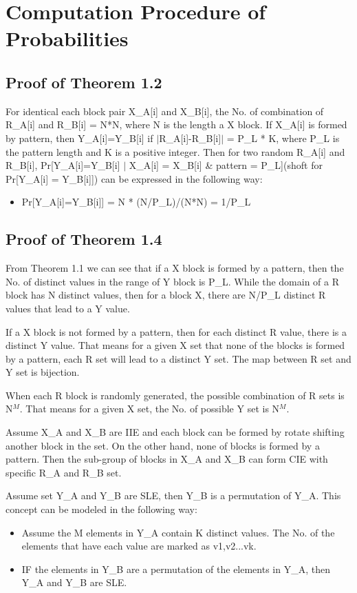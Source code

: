 \documentclass{article}
\begin{document}
\section{Computation Procedure of Probabilities}
\subsection{Proof of Theorem 1.2}
For identical each block pair X\_A[i] and X\_B[i], the No. of combination of R\_A[i] and R\_B[i] = N*N, where N is the length a X block. 
If X\_A[i] is formed by pattern, then Y\_A[i]=Y\_B[i] if $\mid$R\_A[i]-R\_B[i]$\mid$ = P\_L * K, where P\_L is the pattern length and K is a positive integer. 
Then for two random R\_A[i] and R\_B[i], Pr[Y\_A[i]=Y\_B[i] $\mid$ X\_A[i] = X\_B[i] \& pattern = P\_L](shoft for Pr[Y\_A[i] = Y\_B[i]]) can be expressed in the following way:
\begin{itemize}
	\item Pr[Y\_A[i]=Y\_B[i]] = N * (N/P\_L)/(N*N) = 1/P\_L
\end{itemize} 

\subsection{Proof of Theorem 1.4}
From Theorem 1.1 we can see that if a X block is formed by a pattern, then the No. of distinct values in the range of Y block is P\_L. While the domain of a R block has N distinct values, then for a block X, there are N/P\_L distinct R values that lead to a Y value.

If a X block is not formed by a pattern, then for each distinct R value, there is a distinct Y value. That means for a given X set that none of the blocks is formed by a pattern, each R set will lead to a distinct Y set. The map between R set and Y set is bijection.

When each R block is randomly generated, the possible combination of R sets is N$^M$. That means for a given X set, the No. of possible Y set is N$^M$.

Assume X\_A and X\_B are IIE and each block can be formed by rotate shifting another block in the set. On the other hand, none of blocks is formed by a pattern. Then the sub-group of blocks in X\_A and X\_B can form CIE with specific R\_A and R\_B set. 

Assume set Y\_A and Y\_B are SLE, then Y\_B is a permutation of Y\_A. This concept can be modeled in the following way:
\begin{itemize}
	\item Assume the M elements in Y\_A contain K distinct values. The No. of the elements that have each value are marked as v1,v2...vk.
	\item IF the elements in Y\_B are a permutation of the elements in Y\_A, then Y\_A and Y\_B are SLE.
\end{itemize}
\end{document}
